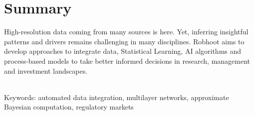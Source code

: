 \documentclass[english,12pt]{article}
\begin{document}
\newpage

\newpage


\tableofcontents
\newpage

\section{Summary}

High-resolution data coming from many sources is here. Yet, inferring
insightful patterns and drivers remains challenging in many
disciplines. Robhoot aims to develop approaches to integrate data,
Statistical Learning, AI algorithms and process-based models to take
better informed decisions in research, management and investment
landscapes.

\\
Keywords: automated data integration, multilayer networks, approximate Bayesian computation, regulatory markets
\newpage
\end{document}
